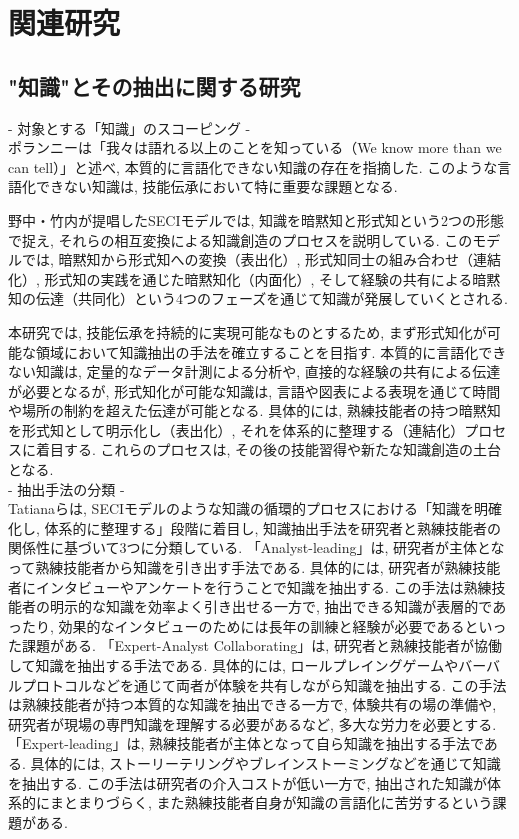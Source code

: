 \chapter{関連研究}
\section{"知識"とその抽出に関する研究}
- 対象とする「知識」のスコーピング -\\
ポランニーは「我々は語れる以上のことを知っている（We know more than we can tell）」と述べ, 本質的に言語化できない知識の存在を指摘した\cite{Polanyi1966}. このような言語化できない知識は, 技能伝承において特に重要な課題となる.

野中・竹内が提唱したSECIモデルでは, 知識を暗黙知と形式知という2つの形態で捉え, それらの相互変換による知識創造のプロセスを説明している\cite{Nonaka1996}. このモデルでは, 暗黙知から形式知への変換（表出化）, 形式知同士の組み合わせ（連結化）, 形式知の実践を通じた暗黙知化（内面化）, そして経験の共有による暗黙知の伝達（共同化）という4つのフェーズを通じて知識が発展していくとされる.

本研究では, 技能伝承を持続的に実現可能なものとするため, まず形式知化が可能な領域において知識抽出の手法を確立することを目指す. 本質的に言語化できない知識は, 定量的なデータ計測による分析や, 直接的な経験の共有による伝達が必要となるが, 形式知化が可能な知識は, 言語や図表による表現を通じて時間や場所の制約を超えた伝達が可能となる. 具体的には, 熟練技能者の持つ暗黙知を形式知として明示化し（表出化）, それを体系的に整理する（連結化）プロセスに着目する. これらのプロセスは, その後の技能習得や新たな知識創造の土台となる.\\

- 抽出手法の分類 -\\
Tatianaらは, SECIモデルのような知識の循環的プロセスにおける「知識を明確化し, 体系的に整理する」段階に着目し, 知識抽出手法を研究者と熟練技能者の関係性に基づいて3つに分類している\cite{Tatiana2012}. 「Analyst-leading」は, 研究者が主体となって熟練技能者から知識を引き出す手法である. 具体的には, 研究者が熟練技能者にインタビューやアンケートを行うことで知識を抽出する. この手法は熟練技能者の明示的な知識を効率よく引き出せる一方で, 抽出できる知識が表層的であったり, 効果的なインタビューのためには長年の訓練と経験が必要であるといった課題がある. 「Expert-Analyst Collaborating」は, 研究者と熟練技能者が協働して知識を抽出する手法である. 具体的には, ロールプレイングゲームやバーバルプロトコルなどを通じて両者が体験を共有しながら知識を抽出する. この手法は熟練技能者が持つ本質的な知識を抽出できる一方で, 体験共有の場の準備や, 研究者が現場の専門知識を理解する必要があるなど, 多大な労力を必要とする. 「Expert-leading」は, 熟練技能者が主体となって自ら知識を抽出する手法である. 具体的には, ストーリーテリングやブレインストーミングなどを通じて知識を抽出する. この手法は研究者の介入コストが低い一方で, 抽出された知識が体系的にまとまりづらく, また熟練技能者自身が知識の言語化に苦労するという課題がある.\\

